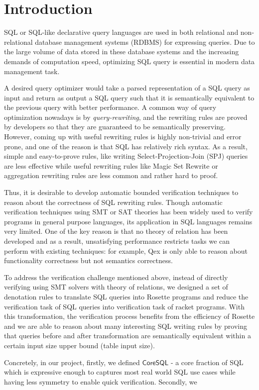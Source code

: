 \section{Introduction}

SQL or SQL-like declarative query languages are used in both relational and non-relational database management systems (RDBMS) for expressing queries. Due to the large volume of data stored in these database systems and the increasing demands of computation speed, optimizing SQL query is essential in modern data management task. 

A desired query optimizer would take a parsed representation of a SQL query as input and return as output a SQL query such that it is semantically equivalent to the previous query with better performance. A common way of query optimization nowadays is by \emph{query-rewriting}, and the rewriting rules are proved by developers so that they are guaranteed to be semantically preserving. However, coming up with useful rewriting rules is highly non-trivial and error prone, and one of the reason is that SQL has relatively rich syntax. As a result, simple and easy-to-prove rules, like writing Select-Projection-Join (SPJ) queries are less effective while useful rewriting rules like Magic Set Rewrite or aggregation rewriting rules are less common and rather hard to proof.

Thus, it is desirable to develop automatic bounded verification techniques to reason about the correctness of SQL rewriting rules. Though automatic verification techniques using SMT or SAT theories has been widely used to verify programs in general purpose languages, its application in SQL languages remains very limited. One of the key reason is that no theory of relation has been developed and as a result, unsatisfying performance restricts tasks we can perform with existing techniques: for example, Qex is only able to reason about functionality correctness but not semantics correctness.

To address the verification challenge mentioned above, instead of directly verifying using SMT solvers with theory of relations, we designed a set of denotation rules to translate SQL queries into Rosette programs and reduce the verification task of SQL queries into verification task of racket programs. With this transformation, the verification process benefits from the efficiency of Rosette and we are able to reason about many interesting SQL writing rules by proving that queries before and after transformation are semantically equivalent within a certain input size upper bound (table input size).

Concretely, in our project, firstly, we defined $\mathsf{CoreSQL}$ - a core fraction of SQL which is expressive enough to captures most real world SQL use cases while having less symmetry to enable quick verification. Secondly, we 